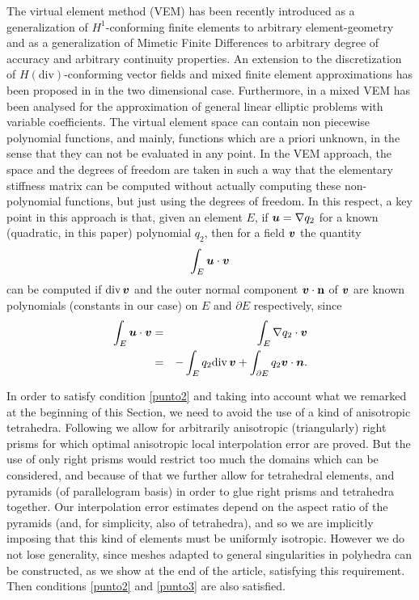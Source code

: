 The virtual element method (VEM) has been recently introduced \cite{BBCMMR} as a generalization of $H^1$-conforming finite elements to arbitrary element-geometry and as a generalization of Mimetic Finite Differences to arbitrary degree of accuracy and arbitrary continuity properties. An extension to the discretization of $H(\mbox{div})$-conforming vector fields and mixed finite element approximations has been proposed in \cite{BFM} in the two dimensional case. Furthermore, in \cite{BBMR} a mixed VEM has been analysed for the approximation of general linear elliptic problems with variable coefficients.  The virtual element space can contain non piecewise polynomial functions, and mainly, functions which are a priori unknown, in the sense that they can not be evaluated in any point. In the VEM approach, the space and the degrees of freedom are taken in such a way that the elementary stiffness matrix can be computed without actually computing these non-polynomial functions, but just using the degrees of freedom. In this respect, a key point in this approach is that, given an element $E$, if $\boldsymbol{u}=\nabla q_2$ for a known (quadratic, in this paper) polynomial $q_2$, then for a field $\boldsymbol{v}$ the quantity 
\[
\int_E\boldsymbol{u}\cdot\boldsymbol{v}
\]
can be computed if $\mbox{div\,}\boldsymbol{v}$ and the outer normal component $\boldsymbol{v}\cdot{\bf n}$ of $\boldsymbol{v}$ are known polynomials (constants in our case) on $E$ and $\partial E$ respectively, since
\begin{eqnarray*}
  \int_E\boldsymbol{u}\cdot\boldsymbol{v} &=&\int_E\nabla 
q_2\cdot\boldsymbol{v}\\&=&-\int_E q_2 \mbox{div\,}\boldsymbol{v} + \int_{\partial E}
q_2\boldsymbol{v}\cdot\boldsymbol{n}.
\end{eqnarray*}


In order to satisfy condition \ref{punto2} and taking into account what we remarked at the beginning of this Section, we need to avoid the use of a kind of anisotropic tetrahedra. Following \cite{FNP} we allow for arbitrarily anisotropic (triangularly) right prisms for which optimal anisotropic local interpolation error are proved. But the use of only right prisms would restrict too much the domains which can be considered, and because of that we further allow for tetrahedral elements, and pyramids (of parallelogram basis) in order to glue right prisms and tetrahedra together. Our interpolation error estimates depend on the aspect ratio of the pyramids (and, for simplicity, also of tetrahedra), and so we are implicitly imposing that this kind of elements must be uniformly isotropic. However we do not lose generality, since meshes adapted to general singularities in polyhedra can be constructed, as we show at the end of the article, satisfying this requirement. Then conditions \ref{punto2} and \ref{punto3} are also satisfied.  

